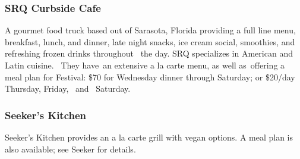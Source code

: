 

\subsubsection{SRQ Curbside Cafe} { \small A gourmet food truck based out of Sarasota, Florida providing a full line
 menu, breakfast, lunch, and dinner, late night snacks, ice cream social, smoothies, and refreshing frozen drinks throughout  the day. SRQ  specializes in American and Latin cuisine.  They have an extensive a la carte menu, as well as offering a meal plan for Festival: \$70 for Wednesday dinner through Saturday; or \$20/day  Thursday, Friday,  and  Saturday.   } 

\subsubsection{Seeker's Kitchen} { \small Seeker's Kitchen provides an a la carte grill with vegan options. A meal plan is also available; see Seeker for details. } 